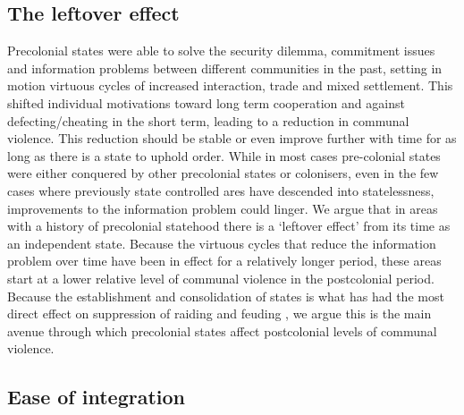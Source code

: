\documentclass[12pt]{article}
\begin{document}
\subsection{The leftover effect}

Precolonial states were able to solve the security dilemma, commitment issues
and information problems between different communities in the past, setting in
motion virtuous cycles of increased interaction, trade and mixed settlement.
This shifted individual motivations toward long term cooperation and against
defecting/cheating in the short term, leading to a reduction in communal
violence. This reduction should be stable or even improve further with time for
as long as there is a state to uphold order. While in most cases pre-colonial
states were either conquered by other precolonial states or colonisers, even in
the few cases where previously state controlled ares have descended into
statelessness, improvements to the information problem could linger. We argue
that in areas with a history of precolonial statehood there is a `leftover
effect' from its time as an independent state. Because the virtuous cycles that
reduce the information problem over time have been in effect for a relatively
longer period, these areas start at a lower relative level of communal violence
in the postcolonial period. Because the establishment and consolidation of
states is what has had the most direct effect on suppression of raiding and
feuding \citep{Pinker2012}, we argue this is the main avenue through which
precolonial states affect postcolonial levels of communal violence.


\subsection{Ease of integration}
\end{document}

